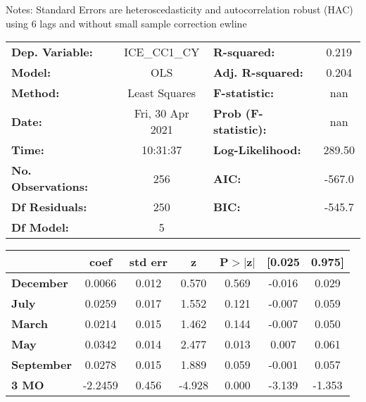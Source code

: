 Notes: \newline
 [1] Standard Errors are heteroscedasticity and autocorrelation robust (HAC) using 6 lags and without small sample correction
ewline\begin{center}
\begin{tabular}{lclc}
\toprule
\textbf{Dep. Variable:}    &   ICE\_CC1\_CY   & \textbf{  R-squared:         } &     0.219   \\
\textbf{Model:}            &       OLS        & \textbf{  Adj. R-squared:    } &     0.204   \\
\textbf{Method:}           &  Least Squares   & \textbf{  F-statistic:       } &       nan   \\
\textbf{Date:}             & Fri, 30 Apr 2021 & \textbf{  Prob (F-statistic):} &      nan    \\
\textbf{Time:}             &     10:31:37     & \textbf{  Log-Likelihood:    } &    289.50   \\
\textbf{No. Observations:} &         256      & \textbf{  AIC:               } &    -567.0   \\
\textbf{Df Residuals:}     &         250      & \textbf{  BIC:               } &    -545.7   \\
\textbf{Df Model:}         &           5      & \textbf{                     } &             \\
\bottomrule
\end{tabular}
\begin{tabular}{lcccccc}
                   & \textbf{coef} & \textbf{std err} & \textbf{z} & \textbf{P$> |$z$|$} & \textbf{[0.025} & \textbf{0.975]}  \\
\midrule
\textbf{December}  &       0.0066  &        0.012     &     0.570  &         0.569        &       -0.016    &        0.029     \\
\textbf{July}      &       0.0259  &        0.017     &     1.552  &         0.121        &       -0.007    &        0.059     \\
\textbf{March}     &       0.0214  &        0.015     &     1.462  &         0.144        &       -0.007    &        0.050     \\
\textbf{May}       &       0.0342  &        0.014     &     2.477  &         0.013        &        0.007    &        0.061     \\
\textbf{September} &       0.0278  &        0.015     &     1.889  &         0.059        &       -0.001    &        0.057     \\
\textbf{3 MO}      &      -2.2459  &        0.456     &    -4.928  &         0.000        &       -3.139    &       -1.353     \\

\end{tabular}
\end{center}
